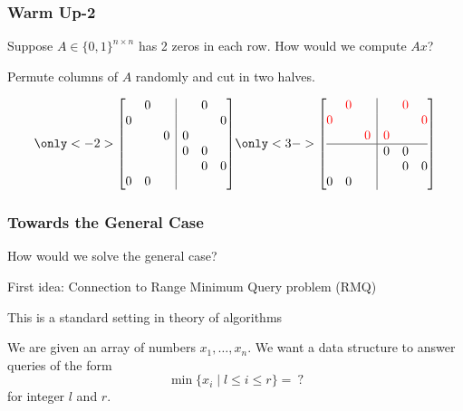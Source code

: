 \documentclass{beamer}
\begin{document}
\begin{frame}
\frametitle{Warm Up-2}

Suppose $A \in \{0,1\}^{n\times n}$ has 2 zeros in each row. How would we compute $Ax$?

\pause
\medskip
Permute columns of $A$ randomly and cut in two halves.

\begin{equation*}\only<-2>{\left[
\begin{array}{@{}ccc|ccc@{}}
     & 0 &  &  & 0 &  \\
    0 &  &  &  &  & 0 \\
     &  & 0 & 0 &  &  \\
     &  &  & 0 & 0 &  \\
     &  &  &  & 0 & 0 \\
     0 & 0 &  &  &  &  \\
    \end{array}
    \right]}
\only<3->{
\left[
\begin{array}{@{}ccc|ccc@{}}
     & \color{red}0 &  &  & \color{red}0 &  \\
    \color{red}0 &  &  &  &  & \color{red}0 \\
     &  & \color{red}0 & \color{red}0 &  &  \\\hline
     &  &  & 0 & 0 &  \\
     &  &  &  & 0 & 0 \\
     0 & 0 &  &  &  &  \\
    \end{array}
    \right]
}
\end{equation*}

\begin{overlayarea}{110mm}{25mm}

\end{overlayarea}



\end{frame}


\begin{frame}
\frametitle{Towards the General Case}

How would we solve the general case?

\medskip
First idea: Connection to Range Minimum Query problem (RMQ)

\medskip
This is a standard setting in theory of algorithms

\medskip
We are given an array of numbers $x_1,\ldots, x_n$. We want a data structure to answer queries of the form 
$$
\min\{x_i \mid l\leq i \leq r\}=\ ?
$$ 
for integer $l$ and $r$.

\end{frame}
\end{document}
